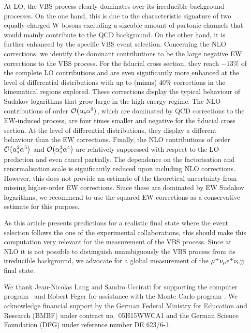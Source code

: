 \documentclass[a4article,11pt]{article}
\begin{document}
At LO, the VBS process clearly dominates over its irreducible
background processes.  On the one hand, this is due to the
characteristic signature of two equally charged W bosons excluding a
sizeable amount of partonic channels that would mainly contribute to
the QCD background. On the other hand, it is further enhanced by the
specific VBS event selection.  Concerning the NLO corrections, we
identify the dominant contributions to be the large negative EW
corrections to the VBS process.
For the fiducial cross section, they reach $-13\%$ of the complete LO contributions 
and are even significantly more enhanced at the level of differential distributions with up to (minus) $40\%$ corrections in the kinematical regions explored.
These corrections display the typical behaviour of Sudakov logarithms that
grow large in the high-energy regime.  
The NLO contributions of order
$\mathcal{O}{\left(\alpha_\text{s}\alpha^{6}\right)}$, which are dominated by
QCD corrections to the EW-induced process, are four times smaller and
negative for the fiducial cross section.  At the level of differential
distributions, they display a different behaviour than the EW
corrections.  Finally, the 
NLO contributions
of order $\mathcal{O}{\left(\alpha_\text{s}^{2}\alpha^{5}\right)}$ and
$\mathcal{O}{\left(\alpha_\text{s}^{3}\alpha^{4}\right)}$ are relatively
suppressed with respect to the LO prediction and even cancel
partially.  The dependence on the factorisation and renormalisation
scale is significantly reduced upon including NLO corrections.
However, this does not provide an estimate of the theoretical
uncertainty from missing higher-order EW corrections.  Since these are
dominated by EW Sudakov logarithms, we recommend to use the
squared EW corrections as a conservative estimate for this purpose.

As this article presents predictions for a realistic final state
where the event selection follows the one of the experimental
collaborations, this should make this computation very relevant for
the measurement of the VBS process.  Since at NLO
it is not possible to distinguish unambiguously the VBS process from
its irreducible background, we advocate for a global measurement
of the $\mu^+\nu_\mu\text{e}^+\nu_{\text{e}}\text{j}\text{j}$ final state.


\acknowledgments We thank Jean-Nicolas Lang and Sandro Uccirati for
supporting the computer program \recola\ and Robert Feger
for assistance with the Monte Carlo program \mocanlo.
We acknowledge financial support by the German Federal Ministry for Education and
Research (BMBF) under contract no.~05H15WWCA1 and the German Science
Foundation (DFG) under reference number DE 623/6-1.


 
\end{document}
